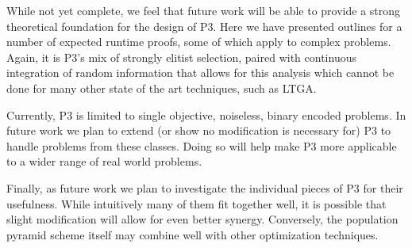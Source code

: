 \documentclass{sig-alternate}
\begin{document}
While not yet complete, we feel that future work will be able to provide a strong
theoretical foundation for the design of P3.  Here we have presented outlines
for a number of expected runtime proofs, some of which apply to complex problems.
Again, it is P3's mix of strongly elitist selection, paired with continuous integration
of random information that allows for this analysis which cannot be done for many
other state of the art techniques, such as LTGA.

Currently, P3 is limited to single objective, noiseless, binary encoded problems.
In future work we plan to extend (or show no modification is necessary for) P3 to handle
problems from these classes.  Doing so will help make P3 more applicable to a wider
range of real world problems.

Finally, as future work we plan to investigate the individual pieces of P3 for
their usefulness.  While intuitively many of them fit together well, it is possible
that slight modification will allow for even better synergy.  Conversely, the population
pyramid scheme itself may combine well with other optimization techniques.

%

%
%
\balancecolumns
\end{document}
